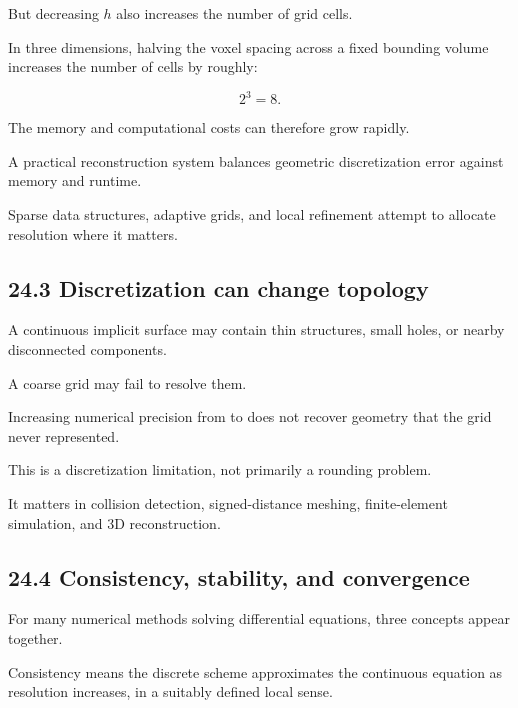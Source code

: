 But decreasing \(h\) also increases the number of grid cells.

In three dimensions, halving the voxel spacing across a fixed bounding volume increases the number of cells by roughly:

\[ 2^3=8. \]

The memory and computational costs can therefore grow rapidly.

A practical reconstruction system balances geometric discretization error against memory and runtime.

Sparse data structures, adaptive grids, and local refinement attempt to allocate resolution where it matters.

\subsection{24.3 Discretization can change topology}\label{02-foundations-ii-ch029-discretization-can-change-topology}

\hypertarget{02-foundations-ii-ch029-discretization-can-change-topology}{}

A continuous implicit surface may contain thin structures, small holes, or nearby disconnected components.

A coarse grid may fail to resolve them.

Increasing numerical precision from  to  does not recover geometry that the grid never represented.

This is a discretization limitation, not primarily a rounding problem.

It matters in collision detection, signed-distance meshing, finite-element simulation, and 3D reconstruction.

\subsection{24.4 Consistency, stability, and convergence}\label{02-foundations-ii-ch029-consistency-stability-and-convergence}

\hypertarget{02-foundations-ii-ch029-consistency-stability-and-convergence}{}

For many numerical methods solving differential equations, three concepts appear together.

Consistency means the discrete scheme approximates the continuous equation as resolution increases, in a suitably defined local sense.

